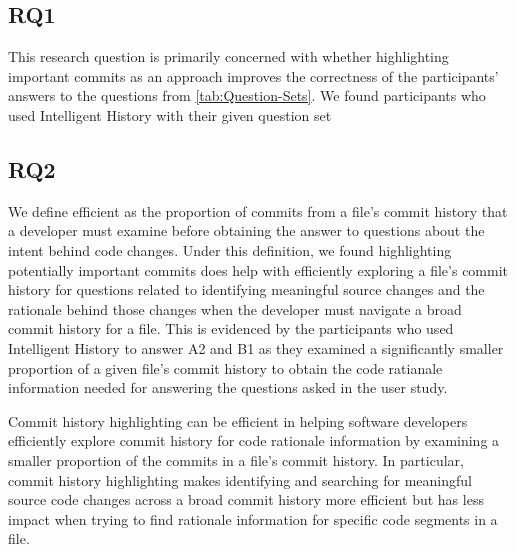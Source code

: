 
\subsection{RQ1}
\label{subsec:RQ1}

This research question is primarily concerned with whether highlighting important commits as an approach improves the 
correctness of the participants' answers to the questions from \autoref{tab:Question-Sets}.
We found participants who used Intelligent History with their given question set 


\subsection{RQ2}
\label{subsec:RQ2}

We define efficient as the proportion of commits from a file's commit history that a developer must examine before obtaining the answer to questions about the intent behind code changes.
Under this definition, we found highlighting potentially important commits does help with efficiently exploring a file's commit history for questions related to identifying meaningful source changes and the rationale behind those changes when the developer must navigate a broad commit history for a file. 
This is evidenced by the participants who used Intelligent History to answer A2 and B1 as they examined a significantly smaller proportion of a given file's commit history to obtain the code ratianale information needed for answering the questions asked in the user study.

\begin{summary}[RQ2]
  Commit history highlighting can be efficient in helping software developers efficiently explore commit history for code rationale information by examining a smaller proportion of the commits in a file's commit history.
  In particular, commit history highlighting makes identifying and searching for meaningful source code changes across a broad commit history more efficient but has less impact when trying to find rationale information for specific code segments in a file.
\end{summary}


